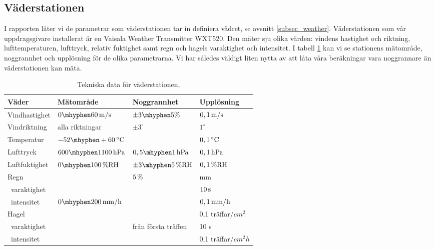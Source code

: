 \subsection{Väderstationen}
\label{subsec_weathertransmitter}
I rapporten låter vi de parametrar som väderstationen tar in definiera vädret, se avsnitt \ref{subsec_weather}. Väderstationen som vår uppdragsgivare installerat är en Vaisala Weather Transmitter WXT520. Den mäter sju olika värden: vindens hastighet och riktning, lufttemperaturen, lufttryck, relativ fuktighet samt regn och hagels varaktighet och intensitet. I tabell \ref{tbl:weathertransmitter} kan vi se stationens mätområde, noggrannhet och upplösning för de olika parametrarna. Vi har således väldigt liten nytta av att låta våra beräkningar vara noggrannare än väderstationen kan mäta.

\begin{table}[htdp]
\caption{Tekniska data för väderstationen, \cite{datasheet_weathertransmitter}}
\begin{center}
\begin{tabular}{|l | l l l|}
\hline
\textbf{Väder} & \textbf{Mätområde} %
 & \textbf{Noggrannhet} %
 & \textbf{Upplösning} \\ %
\hline
\rule{0pt}{3ex}Vindhastighet & $\unit[0\mhyphen 60]{m/s}$ & $\pm 3\mhyphen 5\%$ & $\unit[0,1]{m/s}$ \\ 
\rule{0pt}{3ex}Vindriktning & alla riktningar & $\pm 3^{\circ}$ & $1^{\circ}$ \\
\rule{0pt}{3ex}Temperatur & $\unit[-52\mhyphen +60]{^{\circ}C}$ & & $\unit[0,1]{^{\circ}C}$ \\
\rule{0pt}{3ex}Lufttryck & $\unit[600\mhyphen 1100]{hPa}$ & $\unit[0,5\mhyphen 1]{hPa}$ & $\unit[0,1]{hPa}$ \\
\rule{0pt}{3ex}Luftfuktighet & $\unit[0\mhyphen 100]{\%RH}$ & $\unit[\pm3\mhyphen 5]{\%RH}$ & $\unit[0,1]{\%RH}$ \\
\rule{0pt}{3ex}Regn &  & $\unit[5]{\%}$ & \unit[0,01]{mm} \\
~varaktighet & & & $\unit[10]{s}$\\
~intensitet & $\unit[0\mhyphen 200]{mm/h}$ & & $\unit[0,1]{mm/h}$ \\
\rule{0pt}{3ex}Hagel &  &  & 0,1 träffar/$\unit{cm^2}$ \\
~varaktighet & & från första träffen & 10 s\\
~intensitet & & & 0,1 träffar/$\unit{cm^2h}$\\
\hline
\end{tabular}
\end{center}
\label{tbl:weathertransmitter}
\end{table}

